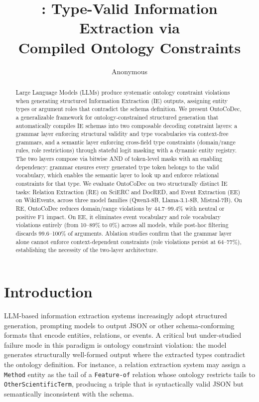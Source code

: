 \documentclass[11pt,a4paper]{article}
\title{\sys{}: Type-Valid Information Extraction via\\Compiled Ontology Constraints}
\author{Anonymous}
\date{}
\newcommand{\sys}{OntoCoDec}
\begin{document}
\maketitle

\begin{abstract}

Large Language Models (LLMs) produce systematic ontology constraint violations when generating structured Information Extraction (IE) outputs, assigning entity types or argument roles that contradict the schema definition. We present \sys{}, a generalizable framework for ontology-constrained structured generation that automatically compiles IE schemas into two composable decoding constraint layers: a grammar layer enforcing structural validity and type vocabularies via context-free grammars, and a semantic layer enforcing cross-field type constraints (domain/range rules, role restrictions) through stateful logit masking with a dynamic entity registry. The two layers compose via bitwise AND of token-level masks with an enabling dependency: grammar ensures every generated type token belongs to the valid vocabulary, which enables the semantic layer to look up and enforce relational constraints for that type. We evaluate \sys{} on two structurally distinct IE tasks: Relation Extraction (RE) on SciERC and DocRED, and Event Extraction (EE) on WikiEvents, across three model families (Qwen3-8B, Llama-3.1-8B, Mistral-7B). On RE, \sys{} reduces domain/range violations by 44.7--99.4\% with neutral or positive F1 impact. On EE, it eliminates event vocabulary and role vocabulary violations entirely (from 10--89\% to 0\%) across all models, while post-hoc filtering discards 99.6--100\% of arguments. Ablation studies confirm that the grammar layer alone cannot enforce context-dependent constraints (role violations persist at 64--77\%), establishing the necessity of the two-layer architecture.

\end{abstract}

\section{Introduction}
\label{sec:intro}

LLM-based information extraction systems increasingly adopt structured generation, prompting models to output JSON or other schema-conforming formats that encode entities, relations, or events. A critical but under-studied failure mode in this paradigm is ontology constraint violation: the model generates structurally well-formed output where the extracted types contradict the ontology definition. For instance, a relation extraction system may assign a \texttt{Method} entity as the tail of a \texttt{Feature-of} relation whose ontology restricts tails to \texttt{OtherScientificTerm}, producing a triple that is syntactically valid JSON but semantically inconsistent with the schema.
\end{document}
